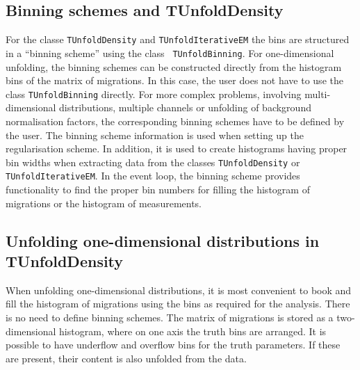 \documentclass[12pt]{article}
\begin{document}
\subsection{Binning schemes and TUnfoldDensity}

For the classe {\tt TUnfoldDensity} and {\tt TUnfoldIterativeEM} the
bins are structured in a ``binning scheme'' using the class {\tt
  TUnfoldBinning}.
For one-dimensional unfolding, the binning schemes can be constructed
directly from the histogram bins of the matrix of migrations. In this
case, the user does not have to use the class {\tt TUnfoldBinning}
directly. For more complex problems,
involving multi-dimensional distributions, multiple channels or
unfolding of background normalisation factors,
the corresponding binning schemes have to be defined by the user.
The binning scheme information is used when setting
up the regularisation scheme. In addition, it is used to
create histograms having proper bin widths when extracting
data from the classes {\tt TUnfoldDensity} or {\tt
  TUnfoldIterativeEM}. In the event loop, the binning scheme provides
functionality to find the proper bin numbers for filling the
histogram of migrations or the histogram of measurements.

\subsection{Unfolding one-dimensional distributions in TUnfoldDensity}

When unfolding one-dimensional distributions, it is most convenient to
book and fill the histogram of migrations using the bins as required for the
analysis. There is no need to define binning schemes.
The matrix of migrations is stored as a two-dimensional histogram, where on
one axis the truth bins are arranged. It is possible to have underflow
and overflow bins for the truth parameters. If these are present,
their content is also unfolded from the data.
\end{document}
